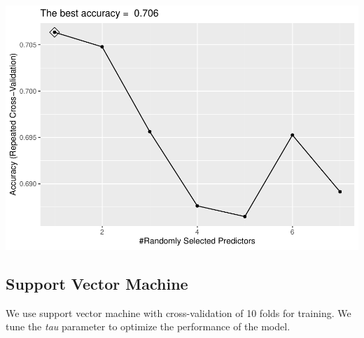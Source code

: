 \documentclass[]{article}
\newenvironment{Shaded}{\begin{snugshade}}{\end{snugshade}}
\newcommand{\CommentTok}[1]{\textcolor[rgb]{0.56,0.35,0.01}{\textit{#1}}}
\newcommand{\DataTypeTok}[1]{\textcolor[rgb]{0.13,0.29,0.53}{#1}}
\newcommand{\KeywordTok}[1]{\textcolor[rgb]{0.13,0.29,0.53}{\textbf{#1}}}
\newcommand{\NormalTok}[1]{#1}
\newcommand{\OperatorTok}[1]{\textcolor[rgb]{0.81,0.36,0.00}{\textbf{#1}}}
\newcommand{\StringTok}[1]{\textcolor[rgb]{0.31,0.60,0.02}{#1}}
\begin{document}
\includegraphics{LiverDisease_files/figure-latex/unnamed-chunk-32-1.pdf}

\begin{Shaded}
\end{Shaded}

\subsection{Support Vector Machine}

We use support vector machine with cross-validation of 10 folds for
training. We tune the \emph{tau} parameter to optimize the performance
of the model.
\end{document}
